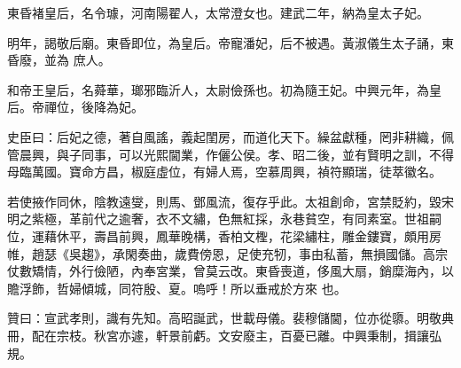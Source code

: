 \begin{pinyinscope}
 東昏褚皇后，名令璩，河南陽翟人，太常澄女也。建武二年，納為皇太子妃。



 明年，謁敬后廟。東昏即位，為皇后。帝寵潘妃，后不被遇。黃淑儀生太子誦，東昏廢，並為
 庶人。



 和帝王皇后，名蕣華，瑯邪臨沂人，太尉儉孫也。初為隨王妃。中興元年，為皇后。帝禪位，後降為妃。



 史臣曰：后妃之德，著自風謠，義起閨房，而道化天下。繰盆獻種，罔非耕織，佩管晨興，與子同事，可以光熙閫業，作儷公侯。孝、昭二後，並有賢明之訓，不得母臨萬國。寶命方昌，椒庭虛位，有婦人焉，空慕周興，禎符顯瑞，徒萃徽名。



 若使掖作同休，陰教遠燮，則馬、鄧風流，復存乎此。太祖創命，宮禁貶約，毀宋明之紫極，革前代之逾奢，衣不文繡，色無紅採，永巷貧空，有同素室。世祖嗣位，運藉休平，壽昌前興，鳳華晚構，香柏文檉，花梁繡柱，雕金鏤寶，頗用房帷，趙瑟《吳趨》，承閑奏曲，歲費傍恩，足使充牣，事由私蓄，無損國儲。高宗仗數矯情，外行儉陋，內奉宮業，曾莫云改。東昏喪道，侈風大扇，銷糜海內，以贍浮飾，哲婦傾城，同符殷、夏。嗚呼！所以垂戒於方來
 也。



 贊曰：宣武孝則，識有先知。高昭誕武，世載母儀。裴穆儲閫，位亦從隳。明敬典冊，配在宗枝。秋宮亦遽，軒景前虧。文安廢主，百憂已離。中興秉制，揖讓弘規。



\end{pinyinscope}